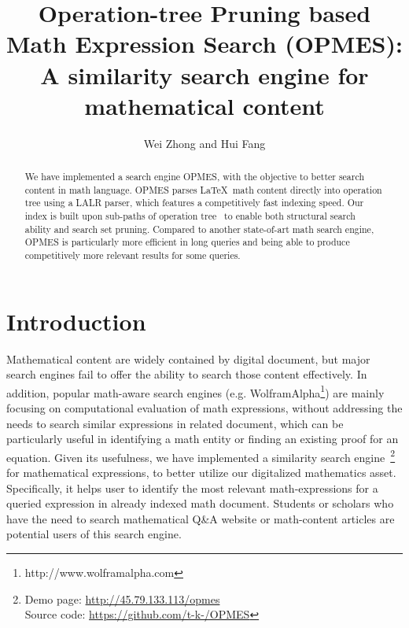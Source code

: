 \documentclass{llncs}
\begin{document}
\title{Operation-tree Pruning based Math Expression Search (OPMES): A similarity search engine for mathematical content}
\author{Wei Zhong and Hui Fang}
\maketitle
%
\begin{abstract}
We have implemented a search engine OPMES, with the objective to better search content in math language.
OPMES parses \LaTeX\ math content directly into operation tree using a LALR parser, which features a competitively fast indexing speed. 
Our index is built upon sub-paths of operation tree~\cite{goodsurvey} to enable both structural search ability and search set pruning. 
Compared to another state-of-art math search engine, OPMES is particularly more efficient in long queries and being able to produce competitively more relevant results for some queries.
\end{abstract}

\section{Introduction}
Mathematical content are widely contained by digital document, but major search engines fail to offer the ability to search those content effectively.
In addition, popular math-aware search engines (e.g. WolframAlpha\footnote{http://www.wolframalpha.com}) are mainly focusing
on computational evaluation of math expressions, without addressing the needs to search similar expressions in related document, which can be particularly useful in identifying a math entity or finding an existing proof for an equation.
Given its usefulness, we have implemented a similarity search engine~\footnote{Demo page: \url{http://45.79.133.113/opmes} \\Source code: \url{https://github.com/t-k-/OPMES}}
for mathematical expressions, to better utilize our digitalized mathematics asset. 
Specifically, it helps user to identify the most relevant math-expressions for a queried expression in already indexed math document.
Students or scholars who have the need to search mathematical Q\&A website or math-content articles are potential users of this search engine.
\end{document}
